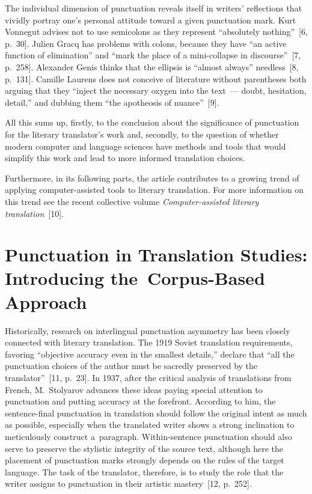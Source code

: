 \begin{multicols}{2}
  The individual dimension of punctuation reveals itself in writers' reflections that 
vividly portray one's personal attitude toward a given punctuation mark. Kurt 
Vonnegut advises not to use semicolons as they represent ``absolutely nothing''~[6, 
p.~30]. Julien Gracq has problems with colons, because they have ``an active 
function of elimination'' and ``mark the place of a mini-collapse in discourse''~[7, 
p.~258]. Alexander Genis thinks that the ellipsis is ``almost always'' needless~[8, 
p.~131]. Camille Laurens does not conceive of literature without parentheses both 
arguing that they ``inject the necessary oxygen into the text~--- doubt, hesitation, 
detail,'' and dubbing them ``the apotheosis of nuance''~[9].
  
  All this sums up, firstly, to the conclusion about the significance of punctuation 
for the literary translator's work and, secondly, to the question of whether modern 
computer and language sciences have methods and tools that would simplify this 
work and lead to more informed translation choices.
  
  Furthermore, in its following parts, the article contributes to a growing trend of 
applying computer-assisted tools to literary translation. For more information on 
this trend see the recent collective volume \textit{Computer-assisted literary 
translation}~[10].
  
    \section{Punctuation in Translation Studies: Introducing the~Corpus-Based Approach}
    
    \noindent
    Historically, research on interlingual punctuation asymmetry has been closely 
connected with literary translation. The 1919 Soviet translation requirements, 
favoring ``objective accuracy even in the smallest details,'' declare that ``all the 
punctuation choices of the author must be sacredly preserved by the 
translator''~[11, p.~23]. In 1937, after the critical analysis of translations from 
French, M.~Stolyarov advances these ideas paying special attention to punctuation 
and putting accuracy at the forefront. According to him, the sentence-final 
punctuation in translation should follow the original intent as much as possible, 
especially when the translated writer shows a strong inclination to meticulously 
construct a~paragraph. Within-sentence punctuation should also serve to preserve 
the stylistic integrity of the source text, although here the placement of punctuation 
marks strongly depends on the rules of the target language. The task of the 
translator, therefore, is to study the role that the writer assigns to punctuation in 
their artistic mastery~[12, p.~252].
    

\end{multicols}
